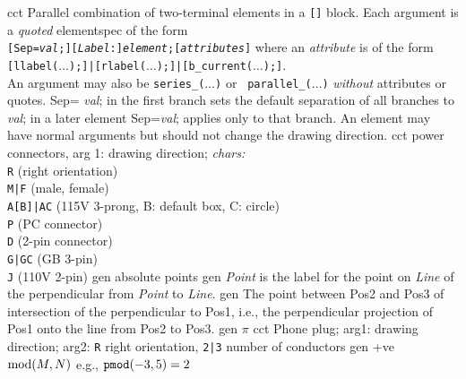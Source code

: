%

%
  {cct}%
  { Parallel combination of two-terminal elements in a {\tt []} block.
    Each argument is a {\em quoted} elementspec of the form\\
    {\tt[Sep={\sl val};][{\sl Label}:]{\sl element};[{\sl attributes}]} where
    an {\sl attribute} is of the form\\
    {\tt[llabel($\ldots$);]|[rlabel($\ldots$);]|[b\_current($\ldots$);]}.\\
    An argument may also be {\tt series\_($\ldots$)} or {\tt
    parallel\_($\ldots$)} {\em without} attributes or quotes.  Sep={\sl
    val}; in the first branch sets the default separation of all branches
    to {\sl val}; in a later element Sep={\sl val}; applies only to
    that branch.  An element may have normal arguments but should not
    change the drawing direction.
   }%
%
  {cct}%
  {power connectors, arg 1: drawing direction; {\sl chars:}\\
   {\tt R} (right orientation)\\
   {\tt M|F} (male, female)\\
   {\tt A[B]|AC} (115V 3-prong, B: default box, C: circle)\\
   {\tt P} (PC connector)\\
   {\tt D} (2-pin connector)\\
   {\tt G|GC} (GB 3-pin)\\
   {\tt J} (110V 2-pin)
    }%
%
  {gen}%
  {absolute points}%
%
  {gen}%
  {{\sl Point} is the label for the point on {\sl Line} of the
  perpendicular
   from {\sl Point} to {\sl Line}.}%
%
  {gen}%
  {The point between Pos2 and Pos3 of intersection of the perpendicular
   to Pos1, i.e., the perpendicular projection of Pos1 onto the line
   from Pos2 to Pos3.}%
%
  {gen}%
  {$\pi$}%
%
  {cct}%
  {Phone plug; arg1: drawing direction; arg2: {\tt R} right orientation,
   {\tt 2|3} number of conductors}%
%
  {gen}%
  {+ve $\hbox{mod}(M,N)$ e.g., $\hbox{\tt pmod}(-3,5)=2$}%
%
